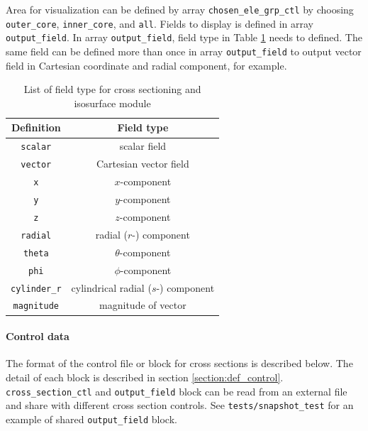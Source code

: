 Area for visualization can be defined by array \verb|chosen_ele_grp_ctl| by choosing \verb|outer_core|, \verb|inner_core|, and \verb|all|. Fields to display is defined in array \verb|output_field|. In array \verb|output_field|, field type in Table \ref{table:field_type} needs to defined. The same field can be defined more than once in array \verb|output_field| to output vector field in Cartesian coordinate and radial component, for example.
%
\begin{table}[htp]
\caption{List of field type for cross sectioning and isosurface module}
\label{table:field_type}
\begin{center} 
\begin{tabular}{|c|c|}
\hline
 Definition & Field type  \\ \hline \hline
 \verb|scalar| & scalar field  \\ \hline
 \verb|vector| & Cartesian vector field \\ \hline
 \verb|x| & $x$-component  \\ \hline
 \verb|y| & $y$-component  \\ \hline
 \verb|z| & $z$-component  \\ \hline
 \verb|radial| & radial ($r$-) component  \\ \hline
 \verb|theta| & $\theta$-component  \\ \hline
 \verb|phi| & $\phi$-component  \\ \hline
 \verb|cylinder_r| & cylindrical radial ($s$-) component  \\ \hline
 \verb|magnitude| & magnitude of vector  \\ \hline
\end{tabular}
\end{center}
\end{table}
%
\paragraph{Control data} \label{section:section_control}
The format of the control file or block for cross sections is described below. The detail of each block is described in section \ref{section:def_control}.  \verb|cross_section_ctl| and \verb|output_field| block can be read from an external file and share with different cross section controls. See \verb|tests/snapshot_test| for an example of shared \verb|output_field| block.

